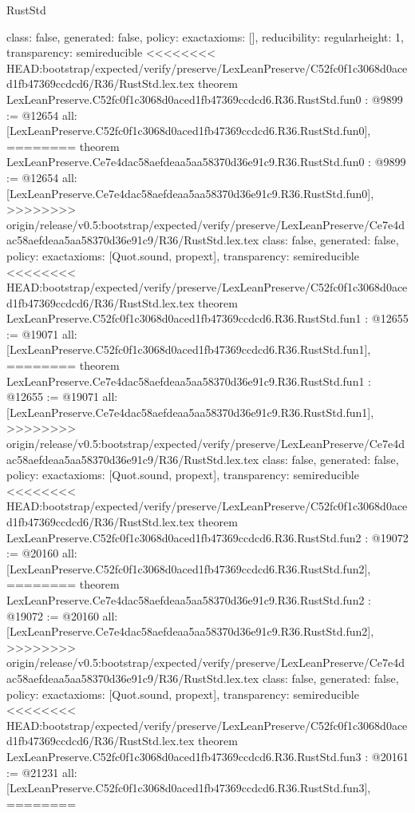 \begin{lexlean}{RustStd}
\begin{coremodule}
{\begin{coremodule}
{{{  class: false,
  generated: false,
  policy: exact{axioms: []},
  reducibility: regular{height: 1},
  transparency: semireducible
}
<<<<<<<< HEAD:bootstrap/expected/verify/preserve/LexLeanPreserve/C52fc0f1c3068d0aced1fb47369ccdcd6/R36/RustStd.lex.tex
theorem LexLeanPreserve.C52fc0f1c3068d0aced1fb47369ccdcd6.R36.RustStd.fun0 : @9899 := @12654 {
  all: [LexLeanPreserve.C52fc0f1c3068d0aced1fb47369ccdcd6.R36.RustStd.fun0],
========
theorem LexLeanPreserve.Ce7e4dac58aefdeaa5aa58370d36e91c9.R36.RustStd.fun0 : @9899 := @12654 {
  all: [LexLeanPreserve.Ce7e4dac58aefdeaa5aa58370d36e91c9.R36.RustStd.fun0],
>>>>>>>> origin/release/v0.5:bootstrap/expected/verify/preserve/LexLeanPreserve/Ce7e4dac58aefdeaa5aa58370d36e91c9/R36/RustStd.lex.tex
  class: false,
  generated: false,
  policy: exact{axioms: [Quot.sound, propext]},
  transparency: semireducible
}
<<<<<<<< HEAD:bootstrap/expected/verify/preserve/LexLeanPreserve/C52fc0f1c3068d0aced1fb47369ccdcd6/R36/RustStd.lex.tex
theorem LexLeanPreserve.C52fc0f1c3068d0aced1fb47369ccdcd6.R36.RustStd.fun1 : @12655 := @19071 {
  all: [LexLeanPreserve.C52fc0f1c3068d0aced1fb47369ccdcd6.R36.RustStd.fun1],
========
theorem LexLeanPreserve.Ce7e4dac58aefdeaa5aa58370d36e91c9.R36.RustStd.fun1 : @12655 := @19071 {
  all: [LexLeanPreserve.Ce7e4dac58aefdeaa5aa58370d36e91c9.R36.RustStd.fun1],
>>>>>>>> origin/release/v0.5:bootstrap/expected/verify/preserve/LexLeanPreserve/Ce7e4dac58aefdeaa5aa58370d36e91c9/R36/RustStd.lex.tex
  class: false,
  generated: false,
  policy: exact{axioms: [Quot.sound, propext]},
  transparency: semireducible
}
<<<<<<<< HEAD:bootstrap/expected/verify/preserve/LexLeanPreserve/C52fc0f1c3068d0aced1fb47369ccdcd6/R36/RustStd.lex.tex
theorem LexLeanPreserve.C52fc0f1c3068d0aced1fb47369ccdcd6.R36.RustStd.fun2 : @19072 := @20160 {
  all: [LexLeanPreserve.C52fc0f1c3068d0aced1fb47369ccdcd6.R36.RustStd.fun2],
========
theorem LexLeanPreserve.Ce7e4dac58aefdeaa5aa58370d36e91c9.R36.RustStd.fun2 : @19072 := @20160 {
  all: [LexLeanPreserve.Ce7e4dac58aefdeaa5aa58370d36e91c9.R36.RustStd.fun2],
>>>>>>>> origin/release/v0.5:bootstrap/expected/verify/preserve/LexLeanPreserve/Ce7e4dac58aefdeaa5aa58370d36e91c9/R36/RustStd.lex.tex
  class: false,
  generated: false,
  policy: exact{axioms: [Quot.sound, propext]},
  transparency: semireducible
}
<<<<<<<< HEAD:bootstrap/expected/verify/preserve/LexLeanPreserve/C52fc0f1c3068d0aced1fb47369ccdcd6/R36/RustStd.lex.tex
theorem LexLeanPreserve.C52fc0f1c3068d0aced1fb47369ccdcd6.R36.RustStd.fun3 : @20161 := @21231 {
  all: [LexLeanPreserve.C52fc0f1c3068d0aced1fb47369ccdcd6.R36.RustStd.fun3],
========
}}}}}}
\end{coremodule}}
\end{coremodule}
\end{lexlean}
